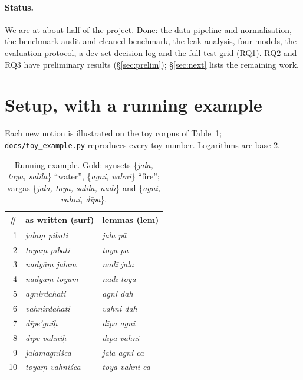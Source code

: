\documentclass[11pt]{article}
\newcommand{\vk}[1]{\textsf{#1}}
\newcommand{\code}[1]{\texttt{\small #1}}
\begin{document}
\paragraph{Status.} We are at about half of the project. Done: the data
pipeline and normalisation, the benchmark audit and cleaned benchmark, the
leak analysis, four models, the evaluation protocol, a dev-set decision log
and the full test grid (RQ1). RQ2 and RQ3 have preliminary results
(\S\ref{sec:prelim}); \S\ref{sec:next} lists the remaining work.

\section{Setup, with a running example}\label{sec:setup}
Each new notion is illustrated on the toy corpus of Table~\ref{tab:toy};
\code{docs/toy\_example.py} reproduces every toy number. Logarithms are base
2.

\begin{table}[t]\centering\footnotesize
\setlength{\tabcolsep}{4pt}
\begin{tabular}{rll}
\toprule
\# & as written (\vk{surf}) & lemmas (\vk{lem})\\
\midrule
1 & \emph{jalaṃ pibati} & \emph{jala pā}\\
2 & \emph{toyaṃ pibati} & \emph{toya pā}\\
3 & \emph{nadyāṃ jalam} & \emph{nadī jala}\\
4 & \emph{nadyāṃ toyam} & \emph{nadī toya}\\
5 & \emph{agnirdahati} & \emph{agni dah}\\
6 & \emph{vahnirdahati} & \emph{vahni dah}\\
7 & \emph{dīpe'gniḥ} & \emph{dīpa agni}\\
8 & \emph{dīpe vahniḥ} & \emph{dīpa vahni}\\
9 & \emph{jalamagniśca} & \emph{jala agni ca}\\
10 & \emph{toyaṃ vahniśca} & \emph{toya vahni ca}\\
\bottomrule
\end{tabular}
\caption{Running example. Gold: synsets \{\emph{jala, toya, salila}\}
``water'', \{\emph{agni, vahni}\} ``fire''; vargas \{\emph{jala, toya,
salila, nadī}\} and \{\emph{agni, vahni, dīpa}\}.}
\label{tab:toy}
\end{table}
\end{document}
